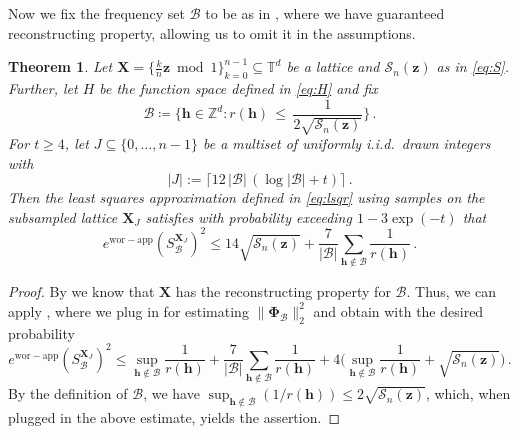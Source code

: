 \documentclass[a4paper]{amsart}
\newtheorem{theorem}{Theorem}[section]
\newcommand{\ewc}{e^{\mathrm{wor-app}}}
\newcommand{\modone}{\bmod{}1}
\begin{document}
Now we fix the frequency set $\mathcal B$ to be as in , where we have guaranteed reconstructing property, allowing us to omit it in the assumptions.

\begin{theorem}\label{boundwithS} Let $\bm X = \{\frac kn\bm z\modone\}_{k=0}^{n-1} \subseteq\mathds T^d$ be a lattice and $\mathcal S_n(\bm z)$ as in \eqref{eq:S}.
    Further, let $H$ be the function space defined in \eqref{eq:H} and fix
    \begin{equation*}
        \mathcal B \coloneqq \Big\{\bm h\in\mathds Z^d : r(\bm h) \,\le\,
        \frac{1}{2\sqrt{\mathcal S_n(\bm z)}} \Big\} \,.
    \end{equation*}
    For $t\ge 4$, let $J\subseteq\{0, \dots, n-1\}$ be a multiset of uniformly i.i.d.\ drawn integers with
    \begin{equation*}
|J| := \lceil 12 \, |\mathcal B| \, (\log|\mathcal B| + t)\rceil \,.
    \end{equation*}
    Then the least squares approximation defined in \eqref{eq:lsqr} using samples on the subsampled lattice $\bm X_J$ satisfies with probability exceeding $1-3\exp(-t)$ that
    \begin{equation*}
        \ewc(S_{\mathcal B}^{\bm X_J})^2
        \le 14 \sqrt{\mathcal S_n(\bm z)}
        + \frac{7}{|\mathcal B|} \sum_{\bm h\notin\mathcal B} \frac{1}{r(\bm h)} \,.
    \end{equation*}
\end{theorem} 

\begin{proof} By  we know that $\bm X$ has the reconstructing property for $\mathcal B$.
    Thus, we can apply , where we plug in  for estimating $\|\bm\Phi_{\mathcal B}\|_{2}^2$ and obtain with the desired probability
    \begin{equation*}
        \ewc(S_{\mathcal B}^{\bm X_J})^2
        \le \sup_{\bm h\notin\mathcal B} \frac{1}{r(\bm h)}
        + \frac{7}{|\mathcal B|} \sum_{\bm h\notin\mathcal B} \frac{1}{r(\bm h)}
        + 4 \Big(
        \sup_{\bm h\notin\mathcal B} \frac{1}{r(\bm h)}
        + \sqrt{\mathcal S_n(\bm z)} \Big) \,.
    \end{equation*}
    By the definition of $\mathcal B$, we have $\sup_{\bm h\notin\mathcal B} (1/r(\bm h)) \le 2\sqrt{\mathcal S_n(\bm z)}$, which, when plugged in the above estimate, yields the assertion.
\end{proof} 
\end{document}
